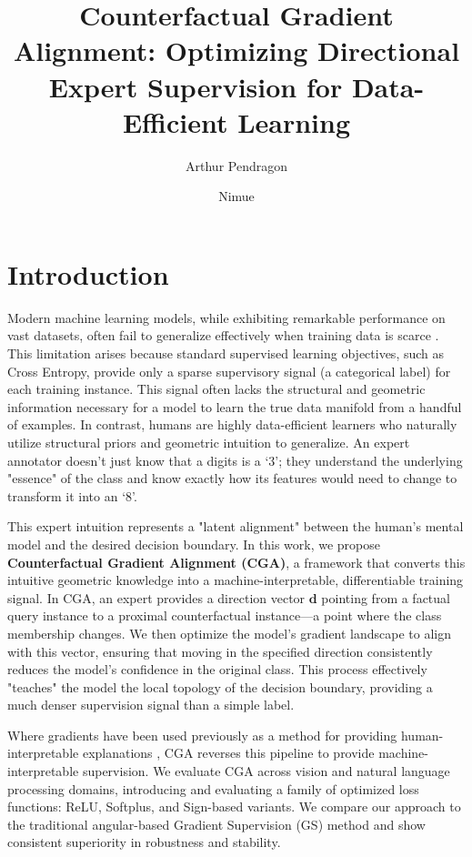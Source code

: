 \documentclass[sigconf,anonymous]{aamas}
\title[Counterfactual Gradient Alignment]{Counterfactual Gradient Alignment: Optimizing Directional Expert Supervision for Data-Efficient Learning}
\author{Arthur Pendragon}
\affiliation{
  \institution{Camelot Castle}
  \city{Camelot}
  \country{United Kingdom}}
\author{Nimue}
\affiliation{
  \institution{The Lady's Lake}
  \city{Avalon}
  \country{United Kingdom}}
\begin{document}
\pagestyle{fancy}
\fancyhead{}

\maketitle 

\section{Introduction}
Modern machine learning models, while exhibiting remarkable performance on vast datasets, often fail to generalize effectively when training data is scarce \cite{hand_classifier, souza2020challenges}. This limitation arises because standard supervised learning objectives, such as Cross Entropy, provide only a sparse supervisory signal (a categorical label) for each training instance. This signal often lacks the structural and geometric information necessary for a model to learn the true data manifold from a handful of examples. In contrast, humans are highly data-efficient learners who naturally utilize structural priors and geometric intuition to generalize. An expert annotator doesn't just know that a digits is a `3'; they understand the underlying "essence" of the class and know exactly how its features would need to change to transform it into an `8'.

This expert intuition represents a "latent alignment" between the human's mental model and the desired decision boundary. In this work, we propose \textbf{Counterfactual Gradient Alignment (CGA)}, a framework that converts this intuitive geometric knowledge into a machine-interpretable, differentiable training signal. In CGA, an expert provides a direction vector $\mathbf{d}$ pointing from a factual query instance to a proximal counterfactual instance---a point where the class membership changes. We then optimize the model's gradient landscape to align with this vector, ensuring that moving in the specified direction consistently reduces the model's confidence in the original class. This process effectively "teaches" the model the local topology of the decision boundary, providing a much denser supervision signal than a simple label.

Where gradients have been used previously as a method for providing human-interpretable explanations \cite{simonyan2013deep}, CGA reverses this pipeline to provide machine-interpretable supervision. We evaluate CGA across vision and natural language processing domains, introducing and evaluating a family of optimized loss functions: ReLU, Softplus, and Sign-based variants. We compare our approach to the traditional angular-based Gradient Supervision (GS) method \cite{teney2020learning} and show consistent superiority in robustness and stability.
\end{document}
